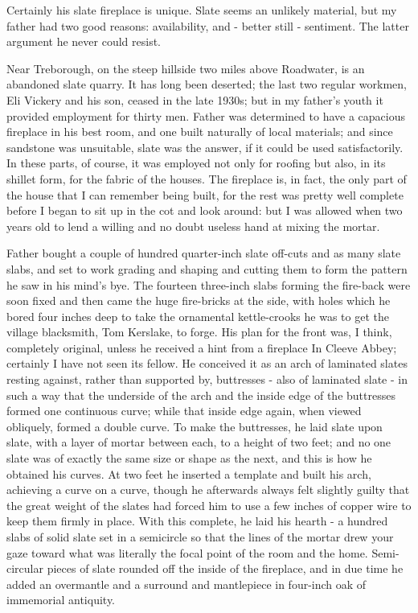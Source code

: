 Certainly his slate fireplace is unique. Slate seems an unlikely material, but my father had two good reasons: availability, and - better still - sentiment. The latter argument he never could resist.

Near Treborough, on the steep hillside two miles above Roadwater, is an abandoned slate quarry. It has long been deserted; the last two regular workmen, Eli Vickery and his son, ceased in the late 1930s; but in my father's youth it provided employment for thirty men. Father was determined to have a capacious fireplace in his best room, and one built naturally of local materials; and since sandstone was unsuitable, slate was the answer, if it could be used satisfactorily. In these parts, of course, it was employed not only for roofing but also, in its shillet form, for the fabric of the houses. The fireplace is, in fact, the only part of the house that I can remember being built, for the rest was pretty well complete before I began to sit up in the cot and look around: but I was allowed when two years old to lend a willing and no doubt useless hand at mixing the mortar.
 

Father bought a couple of hundred quarter-inch slate off-cuts and as many slate slabs, and set to work grading and shaping and cutting them to form the pattern he saw in his mind's bye. The fourteen three-inch slabs forming the fire-back were soon fixed and then came the huge fire-bricks at the side, with holes which he bored four inches deep to take the ornamental kettle-crooks he was to get the village blacksmith, Tom Kerslake, to forge. His plan for the front was, I think, completely original, unless he received a hint from a fireplace In Cleeve Abbey; certainly I have not seen its fellow. He conceived it as an arch of laminated slates resting against, rather than supported by, buttresses - also of laminated slate - in such a way that the underside of the arch and the inside edge of the buttresses formed one continuous curve; while that inside edge again, when viewed obliquely, formed a double curve. To make the buttresses, he laid slate upon slate, with a layer of mortar between each, to a height of two feet; and no one slate was of exactly the same size or shape as the next, and this is how he obtained his curves. At two feet he inserted a template and built his arch, achieving a curve on a curve, though he afterwards always felt slightly guilty that the great weight of the slates had forced him to use a few inches of copper wire to keep them firmly in place. With this complete, he laid his hearth - a hundred slabs of solid slate set in a semicircle so that the lines of the mortar drew your gaze toward what was literally the focal point of the room and the home. Semi-circular pieces of slate rounded off the inside of the fireplace, and in due time he added an overmantle and a surround and mantlepiece in four-inch oak of immemorial antiquity.


